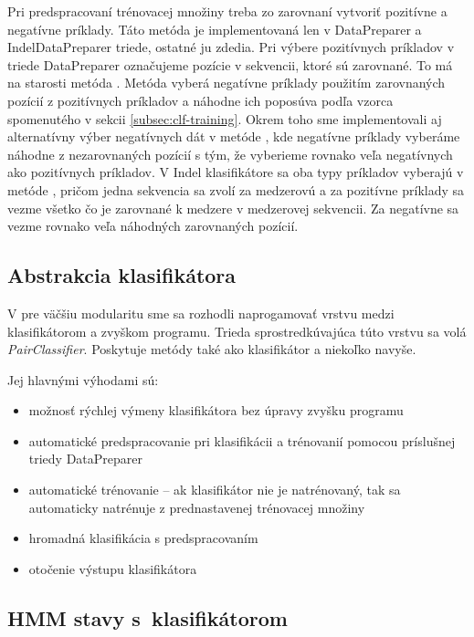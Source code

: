 Pri predspracovaní trénovacej množiny treba zo zarovnaní vytvoriť pozitívne a negatívne príklady. Táto metóda je implementovaná len v DataPreparer a IndelDataPreparer triede, ostatné ju zdedia. Pri výbere pozitívnych príkladov v triede DataPreparer označujeme pozície v sekvencii, ktoré sú zarovnané. To má na starosti metóda . Metóda  vyberá negatívne príklady použitím zarovnaných pozícií z pozitívnych príkladov a náhodne ich poposúva podľa vzorca spomenutého v sekcii \ref{subsec:clf-training}. Okrem toho sme implementovali aj alternatívny výber negatívnych dát v metóde , kde negatívne príklady vyberáme náhodne z nezarovnaných pozícií s tým, že vyberieme rovnako veľa negatívnych ako pozitívnych príkladov. V Indel klasifikátore sa oba typy príkladov vyberajú v metóde , pričom jedna sekvencia sa zvolí za medzerovú a za pozitívne príklady sa vezme všetko čo je zarovnané k medzere v medzerovej sekvencii. Za negatívne sa vezme rovnako veľa náhodných zarovnaných pozícií.

\subsection{Abstrakcia klasifikátora}
\label{subsec:pairclassifier}
V pre väčšiu modularitu sme sa rozhodli naprogamovať vrstvu medzi klasifikátorom a zvyškom programu. Trieda sprostredkúvajúca túto vrstvu sa volá \textit{PairClassifier}. Poskytuje metódy také ako klasifikátor a niekoľko navyše.

Jej hlavnými výhodami sú:

\begin{itemize}
    \item možnosť rýchlej výmeny klasifikátora bez úpravy zvyšku programu
    \item automatické predspracovanie pri klasifikácii a trénovanií pomocou príslušnej triedy DataPreparer
    \item automatické trénovanie -- ak klasifikátor nie je natrénovaný, tak sa automaticky natrénuje z prednastavenej trénovacej množiny
    \item hromadná klasifikácia s predspracovaním
    \item otočenie výstupu klasifikátora
\end{itemize}

\subsection{HMM stavy s~klasifikátorom}
\label{subsec:hmm-states}

